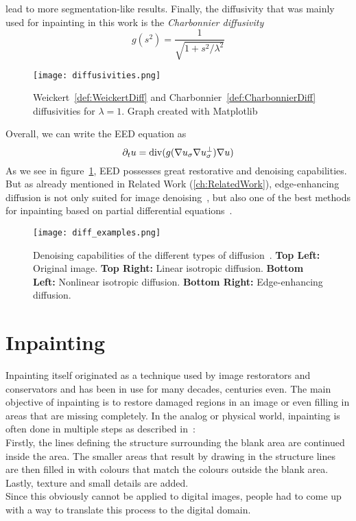 lead to more segmentation-like results.
Finally, the diffusivity that was mainly used for inpainting in this work is the
\textit{Charbonnier diffusivity}~\cite{charbonnier}
\begin{equation}
    g(s^2) = \frac{1}{\sqrt{1 + s^2 / \lambda^2}}\label{def:CharbonnierDiff}
\end{equation}
\begin{figure}[H]
    \centering
    \texttt{[image: diffusivities.png]}
    \caption{Weickert~\eqref{def:WeickertDiff} and Charbonnier~\eqref{def:CharbonnierDiff}
    diffusivities for $\lambda = 1$. Graph created with Matplotlib~\cite{matplotlib}}
\end{figure}
\noindent Overall, we can write the EED equation as
\begin{equation}
    \partial_t u = \operatorname{div}(g(\mathbf{\nabla} u_\sigma\mathbf{\nabla} u_\sigma^\bot)\mathbf{\nabla} u)\label{def:EED}
\end{equation}
As we see in figure~\ref{fig:DiffExamples}, EED possesses great restorative and denoising
capabilities. But as already mentioned in Related Work (\ref{ch:RelatedWork}), edge-enhancing
diffusion is not
only suited for image denoising~\cite{galic05, weickert96}, but also one of the best methods for inpainting based on partial
differential equations~\cite{schmaltz09, galic08, schmaltz14}.
\begin{figure}[H]
    \centering
    \texttt{[image: diff\_examples.png]}
    \caption{Denoising capabilities of the different types of diffusion~\cite{weickert96}. \textbf{Top Left:} Original
        image. \textbf{Top Right:} Linear isotropic diffusion. \textbf{Bottom Left:} Nonlinear
    isotropic diffusion. \textbf{Bottom Right:} Edge-enhancing diffusion.}\label{fig:DiffExamples}
\end{figure}

\section{Inpainting}\label{sec:Inpainting}
Inpainting itself originated as a technique used by image restorators and conservators and has
been in use for many decades, centuries even. The main objective of inpainting is
to restore damaged regions in an image or even filling in areas that are missing
completely. In the analog or physical world, inpainting is often done in multiple steps as
described in~\cite{bertalmio00}:\\
Firstly, the lines defining the structure surrounding the blank area are continued inside the area.
The smaller areas that result by drawing in the structure lines are then filled in with colours that
match the colours outside the blank area.
Lastly, texture and small details are added.\\
Since this obviously cannot be applied to digital images, people had to come up with a way to
translate this process to the digital domain.


